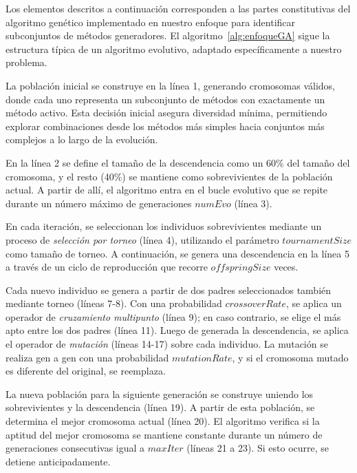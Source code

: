 
Los elementos descritos a continuación corresponden a las partes constitutivas del algoritmo genético implementado en nuestro enfoque 
para identificar subconjuntos de métodos generadores. 
El algoritmo~\ref{alg:enfoqueGA} sigue la estructura típica de un algoritmo evolutivo, adaptado específicamente a nuestro problema.

La población inicial se construye en la línea 1, generando cromosomas válidos, donde cada uno representa un subconjunto de métodos con exactamente un método activo.
Esta decisión inicial asegura diversidad mínima, permitiendo explorar combinaciones desde los métodos más simples hacia conjuntos más complejos 
a lo largo de la evolución.

En la línea 2 se define el tamaño de la descendencia como un 60\% del tamaño del cromosoma, 
y el resto (40\%) se mantiene como sobrevivientes de la población actual. A partir de allí, el algoritmo entra en el bucle evolutivo que se repite durante un número máximo de generaciones $numEvo$ (línea 3).


En cada iteración, se seleccionan los individuos sobrevivientes mediante un proceso de \textit{selección por torneo} (línea 4), utilizando el parámetro $tournamentSize$ como tamaño de torneo.
A continuación, se genera una descendencia en la línea 5 a través de un ciclo de reproducción que recorre $offspringSize$ veces.

Cada nuevo individuo se genera a partir de dos padres seleccionados también mediante torneo (líneas 7-8). 
Con una probabilidad $crossoverRate$, se aplica un operador de \textit{cruzamiento multipunto} (línea 9); en caso contrario, se elige el más apto entre los dos padres (línea 11).
Luego de generada la descendencia, se aplica el operador de \textit{mutación} (líneas 14-17) sobre cada individuo. 
La mutación se realiza gen a gen con una probabilidad $mutationRate$, y si el cromosoma mutado es diferente del original, se reemplaza.

La nueva población para la siguiente generación se construye uniendo los sobrevivientes y la descendencia (línea 19). A partir de esta población, se determina el mejor cromosoma actual (línea 20).
El algoritmo verifica si la aptitud del mejor cromosoma se mantiene constante durante un número de generaciones consecutivas igual a $maxIter$ (líneas 21 a 23). Si esto ocurre, se detiene anticipadamente.

